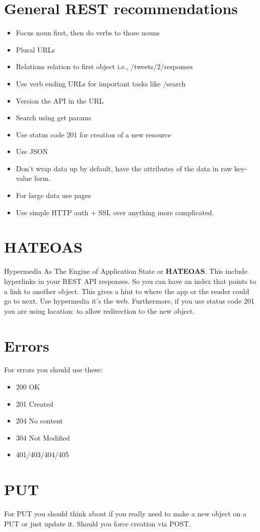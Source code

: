 \documentclass[../CMPUT-404-Notes.tex]{subfiles}
\begin{document}
\section{General REST recommendations}
\begin{itemize}
  \item Focus noun first, then do verbs to those nouns
  \item Plural URLs
  \item Relations relation to first object i.e., /tweets/2/responses
  \item Use verb ending URLs for important tasks like /search
  \item Version the API in the URL
  \item Search using get params
  \item Use status code 201 for creation of a new resource
  \item Use JSON
  \item Don't wrap data up by default, have the attributes of the data in raw key-value form.
  \item For large data use pages
  \item Use simple HTTP auth + SSL over anything more complicated.
\end{itemize}

\section{HATEOAS}
Hypermedia As The Engine of Application State or \textbf{HATEOAS}.
This include hyperlinks in your REST API responses. So you can have an index that points to a link to another object. This gives a hint to where the app or the reader could go to next. Use hypermedia it's the web. Furthermore, if you use status code 201 you are using location: to allow redirection to the new object.

\section{Errors}
For errors you should use these:
\begin{itemize}
  \item 200 OK
  \item 201 Created
  \item 204 No content
  \item 304 Not Modified
  \item 401/403/404/405
\end{itemize}

\section{PUT}
For PUT you should think about if you really need to make a new object on a PUT or just update it. Should you force creation via POST.


  
\end{document}
